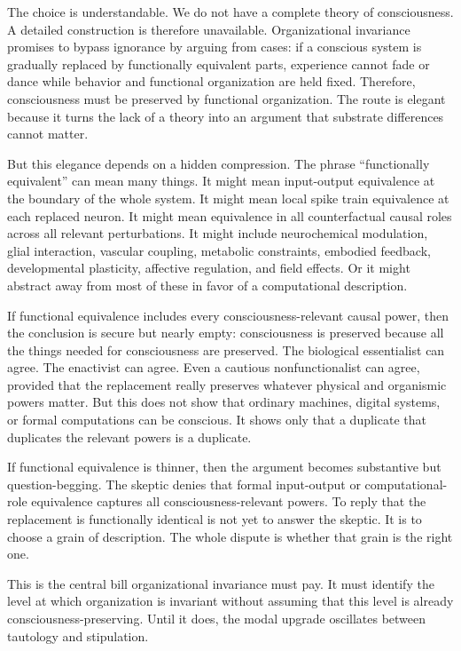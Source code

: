 \documentclass[11pt]{article}
\begin{document}
The choice is understandable. We do not have a complete theory of consciousness. A detailed construction is therefore unavailable. Organizational invariance promises to bypass ignorance by arguing from cases: if a conscious system is gradually replaced by functionally equivalent parts, experience cannot fade or dance while behavior and functional organization are held fixed. Therefore, consciousness must be preserved by functional organization. The route is elegant because it turns the lack of a theory into an argument that substrate differences cannot matter.

But this elegance depends on a hidden compression. The phrase ``functionally equivalent'' can mean many things. It might mean input-output equivalence at the boundary of the whole system. It might mean local spike train equivalence at each replaced neuron. It might mean equivalence in all counterfactual causal roles across all relevant perturbations. It might include neurochemical modulation, glial interaction, vascular coupling, metabolic constraints, embodied feedback, developmental plasticity, affective regulation, and field effects. Or it might abstract away from most of these in favor of a computational description.

If functional equivalence includes every consciousness-relevant causal power, then the conclusion is secure but nearly empty: consciousness is preserved because all the things needed for consciousness are preserved. The biological essentialist can agree. The enactivist can agree. Even a cautious nonfunctionalist can agree, provided that the replacement really preserves whatever physical and organismic powers matter. But this does not show that ordinary machines, digital systems, or formal computations can be conscious. It shows only that a duplicate that duplicates the relevant powers is a duplicate.

If functional equivalence is thinner, then the argument becomes substantive but question-begging. The skeptic denies that formal input-output or computational-role equivalence captures all consciousness-relevant powers. To reply that the replacement is functionally identical is not yet to answer the skeptic. It is to choose a grain of description. The whole dispute is whether that grain is the right one.

This is the central bill organizational invariance must pay. It must identify the level at which organization is invariant without assuming that this level is already consciousness-preserving. Until it does, the modal upgrade oscillates between tautology and stipulation.
\end{document}
